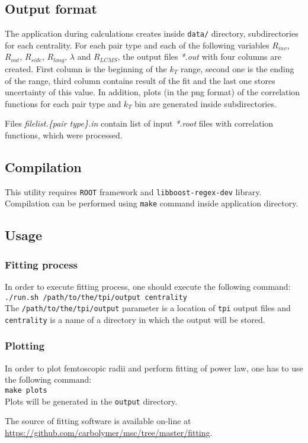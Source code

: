     \subsection{Output format}
      The application during calculations creates inside \verb|data/| directory, subdirectories for each centrality.
      For each pair type and each of the following variables $R_{inv}$, $R_{out}$, $R_{side}$, $R_{long}$, $\lambda$ and $R_{LCMS}$, the output files \textit{*.out} with four columns are created.
      First column is the beginning of the $k_T$ range, second one is the ending of the range, third column contains result of the fit and the last one stores uncertainty of this value.
      In addition, plots (in the png format) of the correlation functions for each pair type and $k_T$ bin are generated inside subdirectories.

      Files \textit{filelist.\{pair type\}.in} contain list of input \textit{*.root} files with correlation functions, which were processed.
    \subsection{Compilation}
      This utility requires \verb|ROOT| framework and \verb|libboost-regex-dev| library.
      Compilation can be performed using \verb|make| command inside application directory.
    \subsection{Usage}
      \subsubsection{Fitting process}
        In order to execute fitting process, one should execute the following command:\\
        \verb|./run.sh /path/to/the/tpi/output centrality|\\
        The \verb|/path/to/the/tpi/output| parameter is a location of \verb|tpi| output files and \verb|centrality| is a name of a directory in which the output will be stored.
      \subsubsection{Plotting}
        In order to plot femtoscopic radii and perform fitting of power law, one has to use the following command:\\
        \verb|make plots|\\
        Plots will be generated in the \verb|output| directory.

        The source of fitting software is available on-line at \url{https://github.com/carbolymer/msc/tree/master/fitting}.

